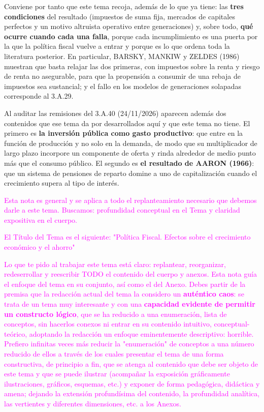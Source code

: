 \documentclass[10pt,a4paper]{article}
\newcounter{anexo}
\begin{document}
{{    Conviene por tanto que este tema recoja, además de lo que ya tiene: las \textbf{tres condiciones} del resultado (impuestos de suma fija, mercados de capitales perfectos y un motivo altruista operativo entre generaciones) y, sobre todo, \textbf{qué ocurre cuando cada una falla}, porque cada incumplimiento es una puerta por la que la política fiscal vuelve a entrar y porque es lo que ordena toda la literatura posterior. En particular, BARSKY, MANKIW y ZELDES (1986) muestran que basta relajar las dos primeras, con impuestos sobre la renta y riesgo de renta no asegurable, para que la propensión a consumir de una rebaja de impuestos sea sustancial; y el fallo en los modelos de generaciones solapadas corresponde al 3.A.29.

    Al auditar las remisiones del 3.A.40 (24/11/2026) aparecen además dos contenidos que ese tema da por desarrollados aquí y que este tema no tiene. El primero es \textbf{la inversión pública como gasto productivo}: que entre en la función de producción y no solo en la demanda, de modo que su multiplicador de largo plazo incorpore un componente de oferta y rinda alrededor de medio punto más que el consumo público. El segundo es \textbf{el resultado de AARON (1966)}: que un sistema de pensiones de reparto domine a uno de capitalización cuando el crecimiento supera al tipo de interés.}
    
    \textcolor{magenta}{Esta nota es general y se aplica a todo el replanteamiento necesario que debemos darle a este tema. Buscamos: profundidad conceptual en el Tema y claridad expositiva en el cuerpo.

    El Título del Tema es el siguiente: "Política Fiscal. Efectos sobre el crecimiento económico y el ahorro"

    Lo que te pido al trabajar este tema está claro: replantear, reorganizar, redeserrollar y reescribir TODO el contenido del cuerpo y anexos. Esta nota guía el enfoque del tema en su conjunto, así como el del Anexo. Debes partir de la premisa que la redacción actual del tema la considero un \textbf{auténtico caos}: se trata de un tema muy interesante y con una \textbf{capacidad evidente de permitir un constructo lógico}, que se ha reducido a una enumeración, lista de conceptos, sin hacerlos conexos ni entrar en su contenido intuitivo, conceptual-teórico, adoptando la redacción un enfoque eminentemente descriptivo: horrible. Prefiero infinitas veces más reducir la "enumeración" de conceptos a una número reducido de ellos a través de los cuales presentar el tema de una forma constructiva, de principio a fin, que se atenga al contenido que debe ser objeto de este tema y que se puede ilustrar (acompañar la exposición gráficamente ilustraciones, gráficos, esquemas, etc.) y exponer de forma pedagógica, didáctica y amena; dejando la extensión profundísima del contenido, la profundidad analítica, las vertientes y diferentes dimensiones, etc. a los Anexos.
    
}}
\end{document}
